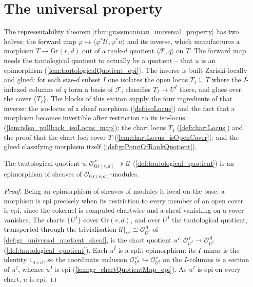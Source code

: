 \section{The universal property}
\label{sec:grquot_universal}

The representability theorem \cref{thm:grassmannian_universal_property} has two halves:
the forward map \(\varphi \mapsto \langle \varphi^{*}\mathcal{U}, \varphi^{*}u\rangle\)
and its inverse, which manufactures a morphism \(T \to \mathrm{Gr}(r,d)\) out of a rank-\(d\)
quotient \(\langle \mathcal{F}, q\rangle\) on \(T\). The forward map needs the tautological
quotient to actually be a quotient -- that \(u\) is an epimorphism
(\cref{lem:tautologicalQuotient_epi}). The inverse is built Zariski-locally and glued: for
each size-\(d\) subset \(I\) one isolates the open locus \(T_I \subseteq T\) where the
\(I\)-indexed columns of \(q\) form a basis of \(\mathcal{F}\), classifies \(T_I \to U^I\)
there, and glues over the cover \(\{T_I\}\). The blocks of this section supply the four
ingredients of that inverse: the iso-locus of a sheaf morphism (\cref{def:isoLocus}) and
the fact that a morphism becomes invertible after restriction to its iso-locus
(\cref{lem:isIso_pullback_isoLocus_map}); the chart locus \(T_I\) (\cref{def:chartLocus})
and the proof that the chart loci cover \(T\) (\cref{lem:chartLocus_isOpenCover}); and the
glued classifying morphism itself (\cref{def:grPointOfRankQuotient}).

\begin{lemma}
  \label{lem:tautologicalQuotient_epi}
  The tautological quotient \(u : \mathcal{O}_{\mathrm{Gr}(r,d)}^{\,r}
  \twoheadrightarrow \mathcal{U}\) (\cref{def:tautological_quotient}) is an epimorphism of
  sheaves of \(\mathcal{O}_{\mathrm{Gr}(r,d)}\)-modules.
\end{lemma}
\begin{proof}
  Being an epimorphism of sheaves of modules is local on the base: a morphism is epi
  precisely when its restriction to every member of an open cover is epi, since the
  cokernel is computed chartwise and a sheaf vanishing on a cover vanishes. The charts
  \(\{U^I\}\) cover \(\mathrm{Gr}(r,d)\), and over \(U^I\) the tautological quotient,
  transported through the trivialisation \(\mathcal{U}|_{U^I} \cong \mathcal{O}_{U^I}^{\,d}\)
  of \cref{def:gr_universal_quotient_sheaf}, is the chart quotient \(u^I :
  \mathcal{O}_{U^I}^{\,r} \to \mathcal{O}_{U^I}^{\,d}\) (\cref{def:tautological_quotient}).
  Each \(u^I\) is a split epimorphism: its \(I\)-minor is the identity \(1_{d\times d}\),
  so the coordinate inclusion \(\mathcal{O}_{U^I}^{\,d} \hookrightarrow
  \mathcal{O}_{U^I}^{\,r}\) on the \(I\)-columns is a section of \(u^I\), whence \(u^I\) is
  epi (\cref{lem:gr_chartQuotientMap_epi}). As \(u^I\) is epi on every chart, \(u\) is epi.
\end{proof}


